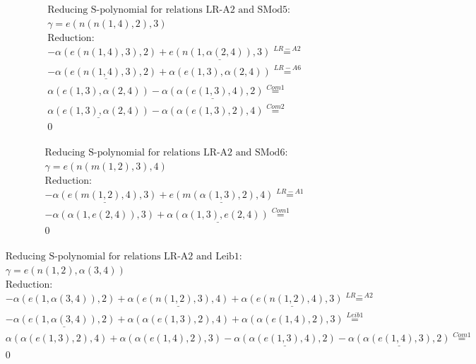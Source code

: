 \documentclass[11pt]{amsart}
\begin{document}
\begin{align*} 
& \text{Reducing S-polynomial for relations LR-A2 and SMod5:} \\ 
& \gamma = e(n(n(1,4),2),3) \\ 
& \text{Reduction}: \\& - \alpha(e(n(1,4),3),2) + \underline{e(n(1,\alpha(2,4)),3)} \stackrel{ LR-A2 }{=}  \\ 
& - \underline{\alpha(e(n(1,4),3),2)} + \alpha(e(1,3),\alpha(2,4)) \stackrel{ LR-A6 }{=}  \\ 
&\alpha(e(1,3),\alpha(2,4)) - \underline{\alpha(\alpha(e(1,3),4),2)} \stackrel{ Com1 }{=}  \\ 
&\underline{\alpha(e(1,3),\alpha(2,4))} - \alpha(\alpha(e(1,3),2),4) \stackrel{ Com2 }{=}  \\ 
&0\\ 
\end{align*} 
 
\begin{align*} 
& \text{Reducing S-polynomial for relations LR-A2 and SMod6:} \\ 
& \gamma = e(n(m(1,2),3),4) \\ 
& \text{Reduction}: \\& - \underline{\alpha(e(m(1,2),4),3)} + \underline{e(m(\alpha(1,3),2),4)} \stackrel{ LR-A1 }{=}  \\ 
& - \alpha(\alpha(1,e(2,4)),3) + \underline{\alpha(\alpha(1,3),e(2,4))} \stackrel{ Com1 }{=}  \\ 
&0\\ 
\end{align*} 
 
\begin{align*} 
& \text{Reducing S-polynomial for relations LR-A2 and Leib1:} \\ 
& \gamma = e(n(1,2),\alpha(3,4)) \\ 
& \text{Reduction}: \\& - \alpha(e(1,\alpha(3,4)),2) + \underline{\alpha(e(n(1,2),3),4)} + \underline{\alpha(e(n(1,2),4),3)} \stackrel{ LR-A2 }{=}  \\ 
& - \underline{\alpha(e(1,\alpha(3,4)),2)} + \alpha(\alpha(e(1,3),2),4) + \alpha(\alpha(e(1,4),2),3) \stackrel{ Leib1 }{=}  \\ 
&\alpha(\alpha(e(1,3),2),4) + \alpha(\alpha(e(1,4),2),3) - \underline{\alpha(\alpha(e(1,3),4),2)} - \underline{\alpha(\alpha(e(1,4),3),2)} \stackrel{ Com1 }{=}  \\ 
&0\\ 
\end{align*} 
 
\end{document}
